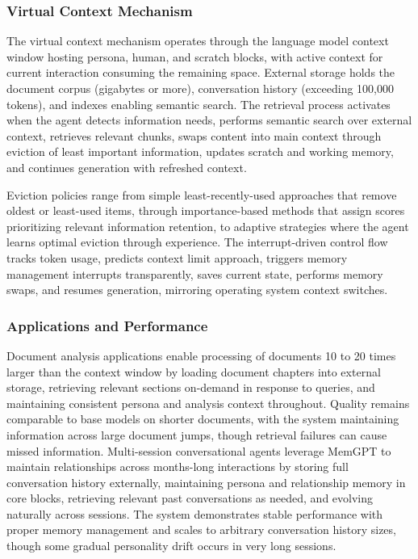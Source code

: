 \documentclass[11pt,letterpaper]{article}
\begin{document}
\subsubsection{Virtual Context Mechanism}

The virtual context mechanism operates through the language model context window hosting persona, human, and scratch blocks, with active context for current interaction consuming the remaining space. External storage holds the document corpus (gigabytes or more), conversation history (exceeding 100,000 tokens), and indexes enabling semantic search. The retrieval process activates when the agent detects information needs, performs semantic search over external context, retrieves relevant chunks, swaps content into main context through eviction of least important information, updates scratch and working memory, and continues generation with refreshed context.

Eviction policies range from simple least-recently-used approaches that remove oldest or least-used items, through importance-based methods that assign scores prioritizing relevant information retention, to adaptive strategies where the agent learns optimal eviction through experience. The interrupt-driven control flow tracks token usage, predicts context limit approach, triggers memory management interrupts transparently, saves current state, performs memory swaps, and resumes generation, mirroring operating system context switches.

\subsubsection{Applications and Performance}

Document analysis applications enable processing of documents 10 to 20 times larger than the context window by loading document chapters into external storage, retrieving relevant sections on-demand in response to queries, and maintaining consistent persona and analysis context throughout. Quality remains comparable to base models on shorter documents, with the system maintaining information across large document jumps, though retrieval failures can cause missed information. Multi-session conversational agents leverage MemGPT to maintain relationships across months-long interactions by storing full conversation history externally, maintaining persona and relationship memory in core blocks, retrieving relevant past conversations as needed, and evolving naturally across sessions. The system demonstrates stable performance with proper memory management and scales to arbitrary conversation history sizes, though some gradual personality drift occurs in very long sessions.
\end{document}
